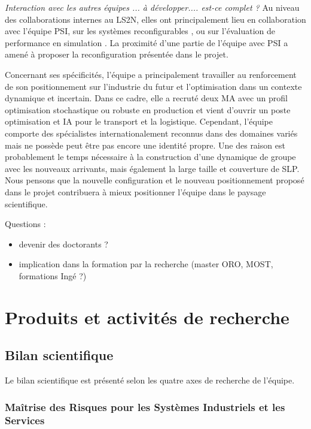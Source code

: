 \textit{Interaction avec les autres équipes ... à développer.... est-ce complet ?}
Au niveau des collaborations internes au LS2N, elles ont principalement lieu en collaboration avec l'équipe PSI, sur les systèmes reconfigurables  \cite{lameche:hal-02354553, kouiss:hal-02354412}, ou sur l'évaluation de performance en simulation \cite{indriago:hal-01693153,indriago:hal-01628882}. 
La proximité d'une partie de l'équipe avec PSI a amené à proposer la reconfiguration présentée dans le projet.

Concernant ses spécificités, l'équipe a principalement travailler au renforcement de son positionnement sur l'industrie du futur et l'optimisation dans un contexte dynamique et incertain. Dans ce cadre, elle a recruté deux MA avec un profil optimisation stochastique ou robuste en production et vient d'ouvrir un poste optimisation et IA pour le transport et la logistique. 
Cependant, l'équipe comporte des spécialistes internationalement reconnus dans des domaines variés mais ne possède peut être pas encore une identité propre. Une des raison est probablement le temps nécessaire à la construction d'une dynamique de groupe avec les nouveaux arrivants, mais également la large taille et couverture de SLP. 
Nous pensons que la nouvelle configuration et le nouveau positionnement proposé dans le projet contribuera à mieux positionner l'équipe dans le paysage scientifique. 

Questions : 
\begin{itemize}
    \item devenir des doctorants ?
    \item implication dans la formation par la recherche (master ORO, MOST, formations Ingé ?)
\end{itemize}


  \vfill
\rule[\baselineskip]{0pt}{\baselineskip}
 \section{Produits et activités de recherche}
 	
\subsection{Bilan scientifique}

Le bilan scientifique est présenté selon les quatre axes de recherche de l'équipe. 		

\subsubsection{Maîtrise des Risques pour les Systèmes Industriels et les Services}

